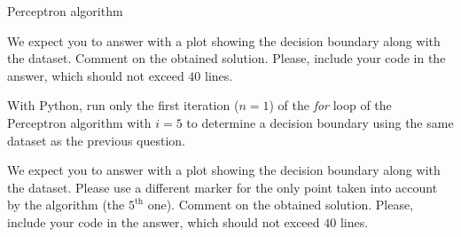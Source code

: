 \documentclass[
	ngerman,
	points=true,%
    solution=true,
    accentcolor=9c,
    colorbacktitle
	]{tudaexercise}
\begin{document}
\begin{task}{Perceptron algorithm}
\begin{subtask}
We expect you to answer with a plot showing the decision boundary along with the dataset. Comment on the obtained solution. Please, include your code in the answer, which should not exceed $40$ lines.
\end{subtask}
\begin{solution}

\end{solution}

\begin{subtask}
With Python, run only the first iteration ($n = 1$) of the \textit{for} loop of the Perceptron algorithm with $i=5$ to determine a decision boundary using the same dataset as the previous question.

We expect you to answer with a plot showing the decision boundary along with the dataset. Please use a different marker for the only point taken into account by the algorithm (the $5^{\text{th}}$ one). Comment on the obtained solution. Please, include your code in the answer, which should not exceed $40$ lines.
\end{subtask}
\begin{solution}

\end{solution}
\end{task}
\end{document}
